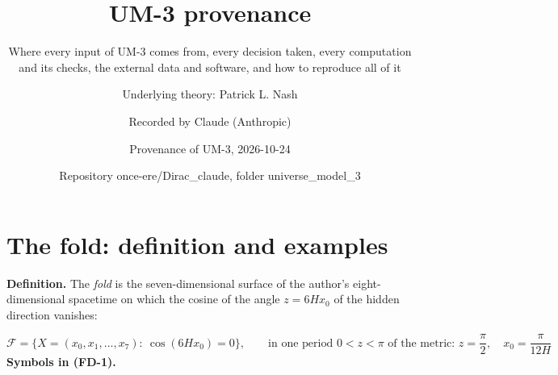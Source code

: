 \documentclass[
  10pt,
]{article}
\title{UM-3 provenance}
\subtitle{Where every input of UM-3 comes from, every decision taken,
every computation and its checks, the external data and software, and
how to reproduce all of it}
\author{Underlying theory: Patrick L. Nash \and Recorded by Claude
(Anthropic) \and Provenance of UM-3, 2026-10-24 \and Repository
once-ere/Dirac\_claude, folder universe\_model\_3}
\date{}
\begin{document}
\maketitle

{
\hypersetup{linkcolor=}
\setcounter{tocdepth}{3}
\tableofcontents
}
\hypertarget{the-fold-definition-and-examples}{%
\section{The fold: definition and
examples}\label{the-fold-definition-and-examples}}

\textbf{Definition.} The \emph{fold} is the seven-dimensional surface of
the author's eight-dimensional spacetime on which the cosine of the
angle \(z = 6Hx_0\) of the hidden direction vanishes:

\[
\mathcal{F} = \big\{X = (x_0, x_1, \dots, x_7):\ \cos(6Hx_0) = 0\big\},\qquad
\text{in one period } 0 < z < \pi\text{ of the metric: } z = \frac{\pi}{2},\quad x_0 = \frac{\pi}{12H} \tag{FD-1}
\] \textbf{Symbols in (FD-1).}
\end{document}
